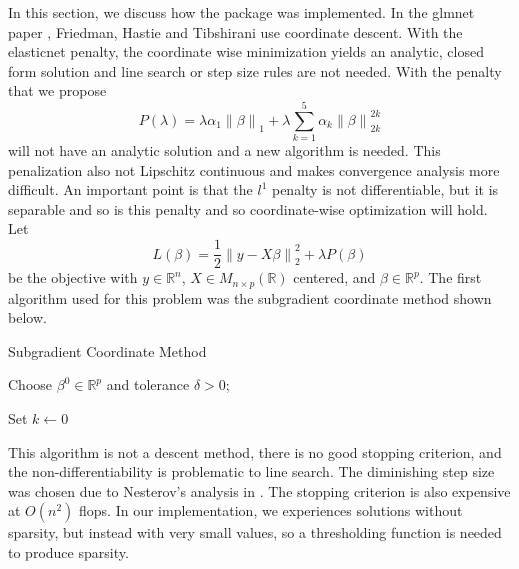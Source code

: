\documentclass[12pt, a4paper, reqno]{article}
\numberwithin{equation}{section}
\newcommand{\norm}[1]{\left\lVert#1\right\rVert}
\newcommand{\R}{\mathbb{R}}
\begin{document}
In this section, we discuss how the package was implemented.
In the glmnet paper \cite{glmnet}, Friedman, Hastie and Tibshirani use coordinate descent.
With the elasticnet \cite{elasticnet} penalty, the coordinate wise minimization yields an analytic, closed form solution and line search or step size rules are not needed. With the penalty that we propose
\[
P(\lambda) = \lambda \alpha_1 \norm{\beta}_1 + \lambda \sum_{k = 1}^{5} \alpha_k \norm{\beta}_{2k}^{2k} 
\]
will not have an analytic solution and a new algorithm is needed.
This penalization also not Lipschitz continuous and makes convergence analysis more difficult.
An important point is that the $l^1$ penalty is not differentiable, but it is separable and so is this penalty and so coordinate-wise optimization will hold.
Let 
\[
L(\beta) = \frac{1}{2} \norm{y - X \beta}_2^2 + \lambda P(\beta)
\]
be the objective with $y \in \R^n$, $X \in M_{n \times p}(\R)$ centered, and $\beta \in \R^p$.
The first algorithm used for this problem was the subgradient coordinate method shown below.

\vspace{.5cm}
\begin{algorithm}[H]
\caption{Subgradient Coordinate Method}
Choose $\beta^0 \in \R^p$ and tolerance $\delta > 0$;

Set $k \gets 0$


\end{algorithm}
\vspace{.5cm}

This algorithm is not a descent method, there is no good stopping criterion, and the non-differentiability is problematic to line search.
The diminishing step size was chosen due to Nesterov's analysis in \cite{nesterov}.
The stopping criterion is also expensive at $O(n^2)$ flops.
In our implementation, we experiences solutions without sparsity, but instead with very small values, so a thresholding function is needed to produce sparsity.
\end{document}
